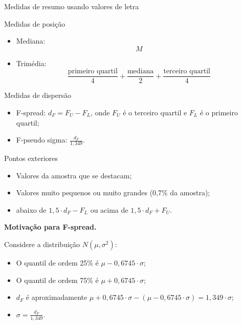 \documentclass[
  10pt,
  ignorenonframetext,
]{beamer}
\providecommand{\tightlist}{%
  \setlength{\itemsep}{0pt}\setlength{\parskip}{0pt}}\usepackage{longtable,booktabs,array}
\begin{document}
\begin{frame}{Medidas de resumo usando valores de letra}
\protect\hypertarget{medidas-de-resumo-usando-valores-de-letra}{}
\begin{block}{Medidas de posição}
\protect\hypertarget{medidas-de-posiuxe7uxe3o}{}
\begin{itemize}
\tightlist
\item
  Mediana: \[M\]
\item
  Trimédia:
  \[\frac{\text{primeiro quartil}}{4} + \frac{\text{mediana}}{2} + \frac{\text{terceiro quartil}}{4}\]
\end{itemize}
\end{block}

\begin{block}{Medidas de dispersão}
\protect\hypertarget{medidas-de-dispersuxe3o}{}
\begin{itemize}
\tightlist
\item
  F-spread: \(d_F = F_U - F_L\), onde \(F_U\) é o terceiro quartil e
  \(F_L\) é o primeiro quartil;
\item
  F-pseudo sigma: \(\frac{d_F}{1,349}\).
\end{itemize}
\end{block}

\begin{block}{Pontos exteriores}
\protect\hypertarget{pontos-exteriores}{}
\begin{itemize}
\tightlist
\item
  Valores da amostra que se destacam;
\item
  Valores muito pequenos ou muito grandes (0,7\% da amostra);
\item
  abaixo de \(1,5\cdot d_F - F_L\) ou acima de \(1,5 \cdot d_F + F_U\).
\end{itemize}
\end{block}
\end{frame}

\begin{frame}
\textbf{Motivação para F-spread.}

Considere a distribuição \(N(\mu, \sigma^2)\):

\begin{itemize}
\tightlist
\item
  O quantil de ordem 25\% é \(\mu - 0,6745\cdot \sigma\);
\item
  O quantil de ordem 75\% é \(\mu + 0,6745\cdot \sigma\);
\item
  \(d_F\) é aproximadamente
  \(\mu + 0,6745\cdot \sigma - (\mu - 0,6745\cdot \sigma) = 1,349\cdot \sigma\);
\item
  \(\sigma = \frac{d_F}{1,349}\).
\end{itemize}
\end{frame}
\end{document}
